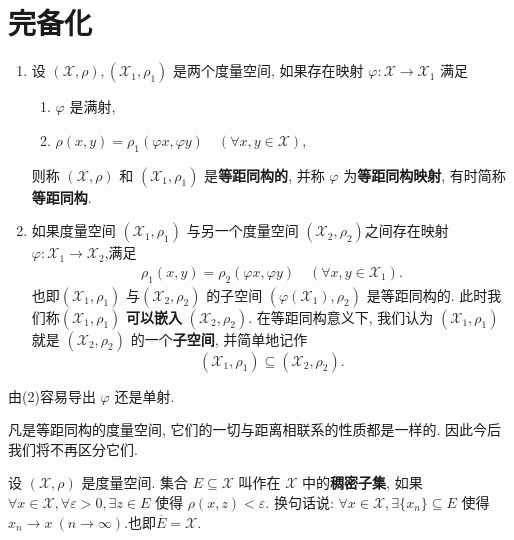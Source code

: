 \documentclass[../../main.tex]{subfiles}%
\begin{document}
\section{完备化}

\begin{definition}
\begin{enumerate}
\item 设 $(\mathscr{X},\rho),(\mathscr{X}_1,\rho_1)$ 是两个度量空间, 如果存在映射 $\varphi:\mathscr{X}\to\mathscr{X}_1$ 满足
\begin{enumerate}[(1)]
\item $\varphi$ 是满射,
\item $\rho(x,y)=\rho_1(\varphi x,\varphi y)\quad (\forall x,y\in\mathscr{X})$,
\end{enumerate}
则称 $(\mathscr{X},\rho)$ 和 $(\mathscr{X}_1,\rho_1)$ 是\textbf{等距同构的}, 并称 $\varphi$ 为\textbf{等距同构映射}, 有时简称\textbf{等距同构}.

\item 如果度量空间 $(\mathscr{X}_1,\rho_1)$ 与另一个度量空间 $(\mathscr{X}_2,\rho_2)$之间存在映射$\varphi:\mathscr{X}_1\to \mathscr{X}_2$,满足
\begin{align*}
\rho_1(x,y)=\rho_2(\varphi x,\varphi y)\quad (\forall x,y\in\mathscr{X}_1).
\end{align*}
也即$(\mathscr{X}_1,\rho_1)$ 与$(\mathscr{X}_2,\rho_2)$ 的子空间 $(\varphi(\mathscr{X}_1),\rho_2)$ 是等距同构的.
此时我们称$(\mathscr{X}_1,\rho_1)$ \textbf{可以嵌入} $(\mathscr{X}_2,\rho_2)$. 在等距同构意义下, 我们认为 $(\mathscr{X}_1,\rho_1)$ 就是 $(\mathscr{X}_2,\rho_2)$ 的一个\textbf{子空间}, 并简单地记作
$$
(\mathscr{X}_1,\rho_1)\subseteq(\mathscr{X}_2,\rho_2).
$$
\end{enumerate}
\end{definition}
\begin{remark}
由(2)容易导出 $\varphi$ 还是单射.
\end{remark}
\begin{remark}
凡是等距同构的度量空间, 它们的一切与距离相联系的性质都是一样的. 因此今后我们将不再区分它们. 
\end{remark}

\begin{definition}[稠密子集]
设 $(\mathscr{X},\rho)$ 是度量空间. 集合 $E\subseteq\mathscr{X}$ 叫作在 $\mathscr{X}$ 中的\textbf{稠密子集}, 如果 $\forall x\in\mathscr{X},\forall\varepsilon>0,\exists z\in E$ 使得 $\rho(x,z)<\varepsilon$. 换句话说: $\forall x\in\mathscr{X},\exists\{x_n\}\subseteq E$ 使得 $x_n\to x\ (n\to\infty)$.也即$\overline{E}=\mathscr{X}$.
\end{definition}
\end{document}
